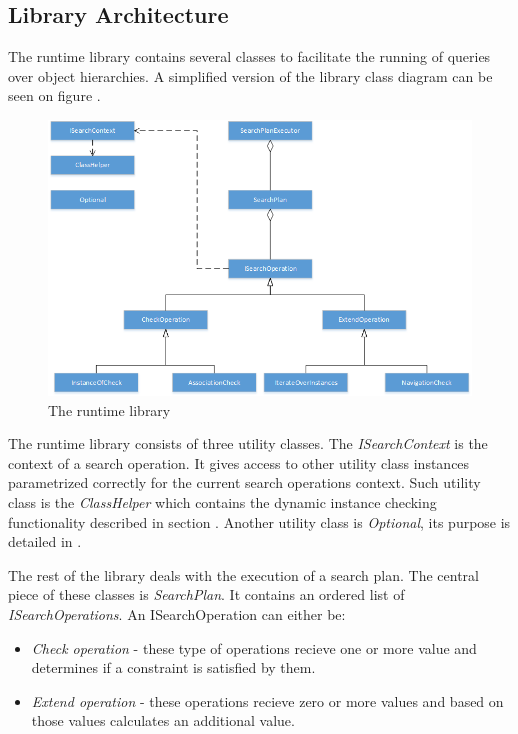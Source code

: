 \subsection{Library Architecture}\label{sect:Runtime_library}

The runtime library contains several classes to facilitate the running of
queries over \CPP{} object hierarchies. A simplified version of the library
class diagram can be seen on figure .

\begin{figure}[!ht]
\centering
\includegraphics[width=150mm, keepaspectratio]{figures/runtime_diagram.png}
\caption{The runtime library}
\label{fig:runtime}
\end{figure}

The runtime library consists of three utility classes. The \emph{ISearchContext}
is the context of a search operation. It gives access to other utility class
instances parametrized correctly for the current search operations context. Such
utility class is the \emph{ClassHelper} which contains the dynamic instance
checking functionality described in section . Another
utility class is \emph{Optional}, its purpose is detailed in
.

The rest of the library deals with the execution of a search plan. The central
piece of these classes is \emph{SearchPlan}. It contains an ordered list of
\emph{ISearchOperations}. An ISearchOperation can either be:

\begin{itemize}
  \item \emph{Check operation} - these type of operations recieve one or more
  value and determines if a constraint is satisfied by them.
  \item \emph{Extend operation} - these operations recieve zero or more values
  and based on those values calculates an additional value.
\end{itemize}

